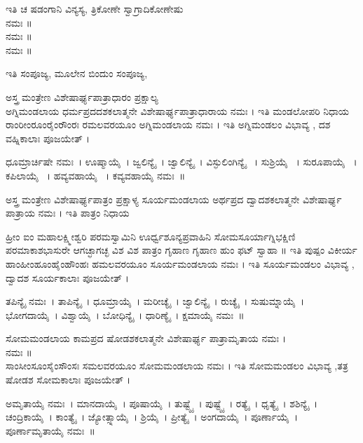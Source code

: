 ಇತಿ ಚ ಷಡಂಗಾನಿ ವಿನ್ಯಸ್ಯ, ತ್ರಿಕೋಣೇ ಸ್ವಾಗ್ರಾದಿಕೋಣೇಷು\\
 ನಮಃ ॥\\
 ನಮಃ ॥\\
 ನಮಃ ॥

ಇತಿ ಸಂಪೂಜ್ಯ, ಮೂಲೇನ ಬಿಂದುಂ ಸಂಪೂಜ್ಯ, 

ಅಸ್ತ್ರ ಮಂತ್ರೇಣ ವಿಶೇಷಾರ್ಘ್ಯಪಾತ್ರಾಧಾರಂ ಪ್ರಕ್ಷಾಲ್ಯ\\
 ಅಗ್ನಿಮಂಡಲಾಯ ಧರ್ಮಪ್ರದದಶಕಲಾತ್ಮನೇ ವಿಶೇಷಾರ್ಘ್ಯಪಾತ್ರಾಧಾರಾಯ ನಮಃ । ಇತಿ ಮಂಡಲೋಪರಿ ನಿಧಾಯ\\
 ರಾಂರೀಂರೂಂರೈಂರೌಂರಃ ರಮಲವರಯೂಂ ಅಗ್ನಿಮಂಡಲಾಯ ನಮಃ । ಇತಿ ಅಗ್ನಿಮಂಡಲಂ ವಿಭಾವ್ಯ , ದಶ ವಹ್ನಿಕಾಲಾಃ ಪೂಜಯೇತ್ ।

 ಧೂಮ್ರಾರ್ಚಿಷೇ   ನಮಃ~।  ಊಷ್ಮಾಯೈ~।  ಜ್ವಲಿನ್ಯೈ~।  ಜ್ವಾಲಿನ್ಯೈ~।  ವಿಸ್ಫುಲಿಂಗಿನ್ಯೈ ~।  ಸುಶ್ರಿಯೈ ~।  ಸುರೂಪಾಯೈ ~।  ಕಪಿಲಾಯೈ ~।  ಹವ್ಯವಹಾಯೈ ~।  ಕವ್ಯವಹಾಯೈ ನಮಃ~॥

ಅಸ್ತ್ರ ಮಂತ್ರೇಣ ವಿಶೇಷಾರ್ಘ್ಯಪಾತ್ರಂ ಪ್ರಕ್ಷಾಳ್ಯ
 ಸೂರ್ಯಮಂಡಲಾಯ ಅರ್ಥಪ್ರದ ದ್ವಾದಶಕಲಾತ್ಮನೇ ವಿಶೇಷಾರ್ಘ್ಯ ಪಾತ್ರಾಯ ನಮಃ । ಇತಿ ಪಾತ್ರಂ ನಿಧಾಯ

 ಹ್ರೀಂ ಐಂ ಮಹಾಲಕ್ಷ್ಮೀಶ್ವರಿ ಪರಮಸ್ವಾಮಿನಿ ಊರ್ಧ್ವಶೂನ್ಯಪ್ರವಾಹಿನಿ ಸೋಮಸೂರ್ಯಾಗ್ನಿಭಕ್ಷಿಣಿ ಪರಮಾಕಾಶಭಾಸುರೇ ಆಗಚ್ಛಾಗಚ್ಛ ವಿಶ ವಿಶ ಪಾತ್ರಂ ಗೃಹಾಣ ಗೃಹಾಣ ಹುಂ ಫಟ್ ಸ್ವಾಹಾ ॥ ಇತಿ ಪುಷ್ಪಂ ವಿಕೀರ್ಯ\\
 ಹಾಂಹೀಂಹೂಂಹೈಂಹೌಂಹಃ ಹಮಲವರಯೂಂ ಸೂರ್ಯಮಂಡಲಾಯ ನಮಃ । ಇತಿ ಸೂರ್ಯಮಂಡಲಂ ವಿಭಾವ್ಯ , ದ್ವಾದಶ ಸೂರ್ಯಕಾಲಾಃ ಪೂಜಯೇತ್ ।

 ತಪಿನ್ಯೈ ನಮಃ~।  ತಾಪಿನ್ಯೈ~।  ಧೂಮ್ರಾಯೈ~।  ಮರೀಚ್ಯೈ~।  ಜ್ವಾಲಿನ್ಯೈ~।  ರುಚ್ಯೈ~।  ಸುಷುಮ್ನಾಯೈ~।  ಭೋಗದಾಯೈ~।  ವಿಶ್ವಾಯೈ~।  ಬೋಧಿನ್ಯೈ~।  ಧಾರಿಣ್ಯೈ~।  ಕ್ಷಮಾಯೈ ನಮಃ~॥

 ಸೋಮಮಂಡಲಾಯ ಕಾಮಪ್ರದ ಷೋಡಶಕಲಾತ್ಮನೇ ವಿಶೇಷಾರ್ಘ್ಯ ಪಾತ್ರಾಮೃತಾಯ ನಮಃ ।\\  ನಮಃ ॥\\
 ಸಾಂಸೀಂಸೂಂಸೈಂಸೌಂಸಃ ಸಮಲವರಯೂಂ ಸೋಮಮಂಡಲಾಯ ನಮಃ । ಇತಿ ಸೋಮಮಂಡಲಂ ವಿಭಾವ್ಯ ,ತತ್ರ ಷೋಡಶ ಸೋಮಕಾಲಾಃ ಪೂಜಯೇತ್ ।

 ಅಮೃತಾಯೈ ನಮಃ~।  ಮಾನದಾಯೈ~।  ಪೂಷಾಯೈ~।  ತುಷ್ಟ್ಯೈ~।  ಪುಷ್ಟ್ಯೈ~।  ರತ್ಯೈ~।  ಧೃತ್ಯೈ~।  ಶಶಿನ್ಯೈ~।  ಚಂದ್ರಿಕಾಯೈ~।  ಕಾಂತ್ಯೈ~।  ಜ್ಯೋತ್ಸ್ನಾಯೈ~।  ಶ್ರಿಯೈ~।  ಪ್ರೀತ್ಯೈ~।  ಅಂಗದಾಯೈ~।  ಪೂರ್ಣಾಯೈ~।  ಪೂರ್ಣಾಮೃತಾಯೈ ನಮಃ~॥

